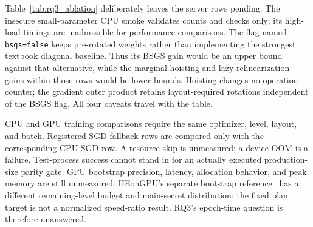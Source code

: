 Table~\ref{tab:rq3_ablation} deliberately leaves the server rows pending. The insecure small-parameter CPU smoke validates counts and checks only; its high-load timings are inadmissible for performance comparisons. The flag named \texttt{bsgs=false} keeps pre-rotated weights rather than implementing the strongest textbook diagonal baseline. Thus its BSGS gain would be an upper bound against that alternative, while the marginal hoisting and lazy-relinearization gains within those rows would be lower bounds. Hoisting changes no operation counter; the gradient outer product retains layout-required rotations independent of the BSGS flag. All four caveats travel with the table.

CPU and GPU training comparisons require the same optimizer, level, layout, and batch. Registered SGD fallback rows are compared only with the corresponding CPU SGD row. A resource skip is unmeasured; a device OOM is a failure. Test-process success cannot stand in for an actually executed production-size parity gate. GPU bootstrap precision, latency, allocation behavior, and peak memory are still unmeasured. HEonGPU's separate bootstrap reference~\cite{heongpuBench} has a different remaining-level budget and main-secret distribution; the fixed plan target is not a normalized speed-ratio result. RQ3's epoch-time question is therefore unanswered.
